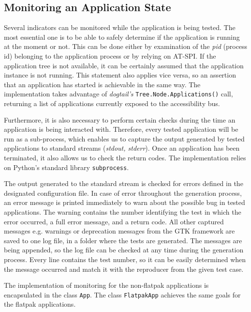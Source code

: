 \subsection{Monitoring an Application State}
Several indicators can be monitored while the application is being tested. The most essential one is to be able to safely determine if the application is running at the moment or not. This can be done either by examination of the \textit{pid} (process id) belonging to the application process or by relying on AT-SPI. If the application tree is not available, it can be certainly assumed that the application instance is not running. This statement also applies vice versa, so an assertion that an application has started is achievable in the same way. The implementation takes advantage of \textit{dogtail's} \texttt{Tree.Node.Applications()} call, returning a list of applications currently exposed to the accessibility bus.

Furthermore, it is also necessary to perform certain checks during the time an application is being interacted with. Therefore, every tested application will be run as a sub-process, which enables us to capture the output generated by tested applications to standard streams (\textit{stdout, stderr}). Once an application has been terminated, it also allows us to check the return codes. The implementation relies on Python's standard library \texttt{subprocess}. 

The output generated to the standard stream is checked for errors defined in the designated configuration file. In case of error throughout the generation process, an error message is printed immediately to warn about the possible bug in tested applications. The warning contains the number identifying the test in which the error occurred, a full error message, and a return code. All other captured messages e.g. warnings or deprecation messages from the GTK framework are saved to one log file, in a folder where the tests are generated. The messages are being appended, so the log file can be checked at any time during the generation process. Every line contains the test number, so it can be easily determined when the message occurred and match it with the reproducer from the given test case.

The implementation of monitoring for the non-flatpak applications is encapsulated in the class \texttt{App}. The class \texttt{FlatpakApp} achieves the same goals for the flatpak applications.

